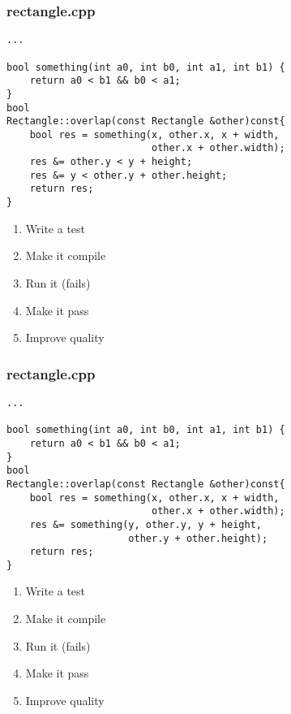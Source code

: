 \begin{frame}[fragile]
\frametitle{rectangle.cpp}
\begin{minipage}[t]{0.48\linewidth}
\begin{lstlisting}
...

bool something(int a0, int b0, int a1, int b1) {
    return a0 < b1 && b0 < a1;
}
bool 
Rectangle::overlap(const Rectangle &other)const{
    bool res = something(x, other.x, x + width, 
                         other.x + other.width);
    res &= other.y < y + height;
    res &= y < other.y + other.height;
    return res;
}
\end{lstlisting}
\end{minipage}\hfill
\begin{minipage}[t]{0.28\linewidth}
  \small
  \begin{enumerate} 
    \item \textcolor{deadcolor}{Write a test}
    \item \textcolor{deadcolor}{Make it compile}
    \item \textcolor{deadcolor}{Run it (fails)}
    \item \textcolor{deadcolor}{Make it pass}
    \item \textcolor{activecolor}{Improve quality}
  \end{enumerate} 
\end{minipage}
\end{frame}


\begin{frame}[fragile]
\frametitle{rectangle.cpp}
\begin{minipage}[t]{0.48\linewidth}
\begin{lstlisting}
...

bool something(int a0, int b0, int a1, int b1) {
    return a0 < b1 && b0 < a1;
}
bool 
Rectangle::overlap(const Rectangle &other)const{
    bool res = something(x, other.x, x + width, 
                         other.x + other.width);
    res &= something(y, other.y, y + height, 
                     other.y + other.height);
    return res;
}
\end{lstlisting}
\end{minipage}\hfill
\begin{minipage}[t]{0.28\linewidth}
  \small
  \begin{enumerate} 
    \item \textcolor{deadcolor}{Write a test}
    \item \textcolor{deadcolor}{Make it compile}
    \item \textcolor{deadcolor}{Run it (fails)}
    \item \textcolor{deadcolor}{Make it pass}
    \item \textcolor{activecolor}{Improve quality}
  \end{enumerate} 
\end{minipage}
\end{frame}


